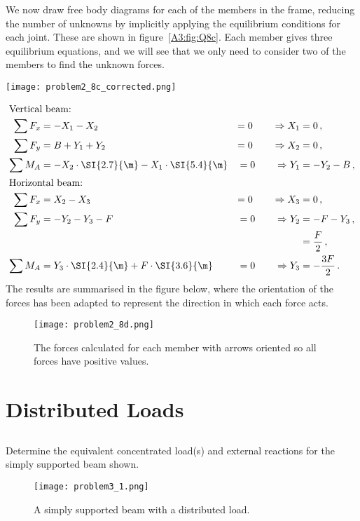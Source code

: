 \documentclass[a4paper,justified,oneside]{tufte-handout}
\numberwithin{equation}{subsection}
\begin{document}
\begin{solution}
We now draw free body diagrams for each of the members in the frame, reducing the number of unknowns by implicitly applying the equilibrium conditions for each joint. These are shown in figure~\ref{A3:fig:Q8c}. Each member gives three equilibrium equations, and we will see that we only need to consider two of the members to find the unknown forces.
\begin{figure*}
	\centering
	\texttt{[image: problem2\_8c\_corrected.png]}
	\caption{Free body diagrams for each of the beams in the frame.}
	\label{A3:fig:Q8c}
\end{figure*}
\begin{alignat*}{2}
\intertext{Vertical beam:}
\sum F_x	&= -X_1-X_2										&=	0	\qquad\Rightarrow	X_1	&=0	\,,\\
\sum F_y	&=	B +Y_1 +Y_2									&=	0	\qquad\Rightarrow	X_2	&=0	\,,\\
\sum M_A	&=	-X_2\cdot\SI{2.7}{\m} -X_1\cdot\SI{5.4}{\m}	&=	0	\qquad\Rightarrow	Y_1	&=-Y_2-B	\,,\\
\intertext{Horizontal beam:}
\sum F_x	&=	X_2-X_3										&=	0	\qquad\Rightarrow	X_3	&=0	\,,\\
\sum F_y	&=	-Y_2 -Y_3 -F								&=	0	\qquad\Rightarrow	Y_2	&=-F-Y_3	\,,\\
			&												&								&=\frac{F}{2}	\,,\\	
\sum M_A	&=	Y_3\cdot\SI{2.4}{\m} +F\cdot\SI{3.6}{\m}	&=	0	\qquad\Rightarrow	Y_3	&=-\frac{3F}{2}		\,.
\end{alignat*}
The results are summarised in the figure below, where the orientation of the forces has been adapted to represent the direction in which each force acts.
\begin{figure}
	\centering
	\texttt{[image: problem2\_8d.png]}
	\caption{The forces calculated for each member with arrows oriented so all forces have positive values.}
	\label{A3:fig:Q8d}
\end{figure}
\end{solution}

\clearpage
\section{Distributed Loads}
\subsection{}
Determine the equivalent concentrated load(s) and external reactions for the simply supported beam shown.
\begin{figure}
	\centering
	\texttt{[image: problem3\_1.png]}
	\caption{A simply supported beam with a distributed load.}
	\label{A4:fig:Q1a}
\end{figure}
\end{document}
